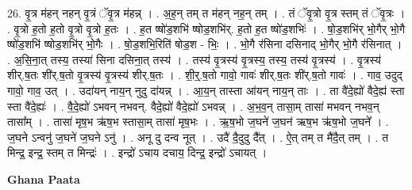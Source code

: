 \documentclass[17pt]{extarticle}
\begin{document}
26. वृ॒त्र म॑हन् नहन् वृ॒त्रं ॅवृ॒त्र म॑हन्न् । . अ॒ह॒न् तम् त म॑हन् नह॒न् तम् । . तं ॅवृ॒त्रो वृ॒त्र स्तम् तं ॅवृ॒त्रः । . वृ॒त्रो ह॒तो ह॒तो वृ॒त्रो वृ॒त्रो ह॒तः । . ह॒त ष्षो॑ड॒शभि॑ ष्षोड॒शभि॑र्. ह॒तो ह॒त ष्षो॑ड॒शभिः॑ । . षो॒ड॒शभि॑र् भो॒गैर् भो॒गै ष्षो॑ड॒शभि॑ ष्षोड॒शभि॑र् भो॒गैः । . षो॒ड॒शभि॒रिति॑ षोड॒श - भिः॒ । . भो॒गै र॑सिना दसिनाद् भो॒गैर् भो॒गै र॑सिनात् । . अ॒सि॒ना॒त् तस्य॒ तस्या॑ सिना दसिना॒त् तस्य॑ । . तस्य॑ वृ॒त्रस्य॑ वृ॒त्रस्य॒ तस्य॒ तस्य॑ वृ॒त्रस्य॑ । . वृ॒त्रस्य॑ शीर्.ष॒तः शी॑र्.ष॒तो वृ॒त्रस्य॑ वृ॒त्रस्य॑ शीर्.ष॒तः । . शी॒र्॒.ष॒तो गावो॒ गावः॑ शीर्.ष॒तः शी॑र्.ष॒तो गावः॑ । . गाव॒ उदुद् गावो॒ गाव॒ उत् । . उदा॑यन् नाय॒न् नुदु दा॑यन्न् । . आ॒य॒न् तास्ता आ॑यन् नाय॒न् ताः । . ता वै॑दे॒ह्यो॑ वैदे॒ह्य॑ स्ता स्ता वै॑दे॒ह्यः॑ । . वै॒दे॒ह्यो॑ ऽभवन् नभवन्. वैदे॒ह्यो॑ वैदे॒ह्यो॑ ऽभवन्न् । . अ॒भ॒व॒न् तासा॒म् तासा॑ मभवन् नभव॒न् तासा᳚म् । . तासा॑ मृष॒भ ऋ॑ष॒भ स्तासा॒म् तासा॑ मृष॒भः । . ऋ॒ष॒भो ज॒घने॑ ज॒घन॑ ऋष॒भ ऋ॑ष॒भो ज॒घने᳚ । . ज॒घने ऽन्वनु॑ ज॒घने॑ ज॒घने ऽनु॑ । . अनू दु दन्व नूत् । . उदै॑ दै॒दुदु दै᳚त् । . ऐ॒त् तम् त मै॑दै॒त् तम् । . त मिन्द्र॒ इन्द्र॒ स्तम् त मिन्द्रः॑ । . इन्द्रो॑ ऽचाय दचाय॒ दिन्द्र॒ इन्द्रो॑ ऽचायत् । \newline

\textbf{Ghana Paata } \newline
\end{document}
